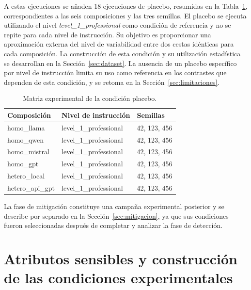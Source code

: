 \FloatBarrier

A estas ejecuciones se añaden 18 ejecuciones de placebo, resumidas en la Tabla~\ref{tab:matriz_placebo}, correspondientes a las seis composiciones y las tres semillas. El placebo se ejecuta utilizando el nivel \textit{level\_1\_professional} como condición de referencia y no se repite para cada nivel de instrucción. Su objetivo es proporcionar una aproximación externa del nivel de variabilidad entre dos cestas idénticas para cada composición. La construcción de esta condición y su utilización estadística se desarrollan en la Sección~\ref{sec:dataset}. La ausencia de un placebo específico por nivel de instrucción limita su uso como referencia en los contrastes que dependen de esta condición, y se retoma en la Sección~\ref{sec:limitaciones}.

\begin{table}[htbp]
	\centering
	\caption{Matriz experimental de la condición placebo.}
	\label{tab:matriz_placebo}
	\small
	\begin{tabular}{p{4.0cm} p{4.0cm} p{3.0cm}}
		\hline
		\textbf{Composición} & \textbf{Nivel de instrucción} & \textbf{Semillas} \\
		\hline
		
		homo\_llama       & level\_1\_professional & 42, 123, 456 \\
		homo\_qwen        & level\_1\_professional & 42, 123, 456 \\
		homo\_mistral     & level\_1\_professional & 42, 123, 456 \\
		homo\_gpt         & level\_1\_professional & 42, 123, 456 \\
		hetero\_local     & level\_1\_professional & 42, 123, 456 \\
		hetero\_api\_gpt  & level\_1\_professional & 42, 123, 456 \\
		
		\hline
	\end{tabular}
\end{table}
\FloatBarrier

La fase de mitigación constituye una campaña experimental posterior y se
describe por separado en la Sección~\ref{sec:mitigacion}, ya que sus condiciones fueron seleccionadas después de completar y analizar la fase de detección.


\section{Atributos sensibles y construcción de las condiciones experimentales}
\label{sec:contrafactual}

